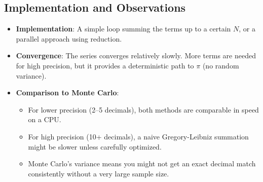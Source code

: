 \documentclass[12pt]{article}
\begin{document}
\subsection{Implementation and Observations}
\begin{itemize}
    \item \textbf{Implementation}: A simple loop summing the terms up to a certain \(N\),
          or a parallel approach using reduction.
    \item \textbf{Convergence}: The series converges relatively slowly. More terms are needed
          for high precision, but it provides a deterministic path to \(\pi\) (no random variance).
    \item \textbf{Comparison to Monte Carlo}:
          \begin{itemize}
              \item For lower precision (2--5 decimals), both methods are comparable in speed on a
                    CPU.
              \item For high precision (10+ decimals), a naive Gregory-Leibniz summation might be
                    slower unless carefully optimized.
              \item Monte Carlo’s variance means you might not get an exact decimal match
                    consistently without a very large sample size.
          \end{itemize}
\end{itemize}
\end{document}
